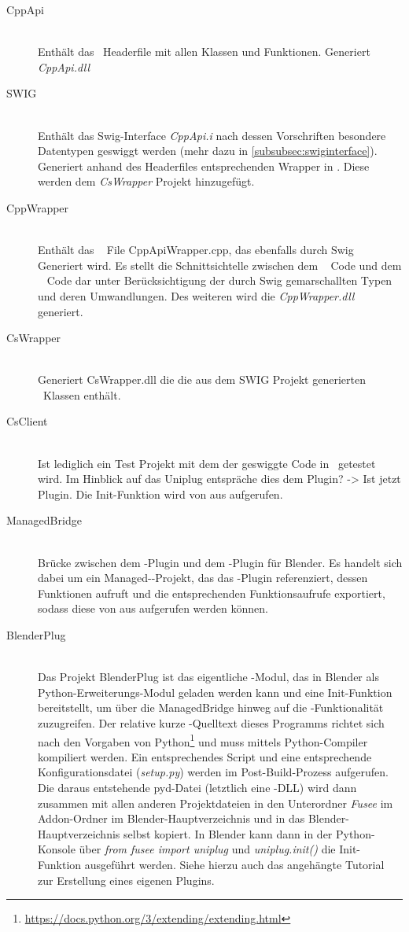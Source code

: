 \begin{description}
\item[CppApi]\hfill \\
Enthält das \CC~Headerfile mit allen Klassen und Funktionen. Generiert \emph{CppApi.dll}
\item[SWIG]\hfill \\
Enthält das Swig-Interface \emph{CppApi.i} nach dessen Vorschriften besondere Datentypen geswiggt werden (mehr dazu in \ref{subsubsec:swiginterface}). Generiert anhand des Headerfiles entsprechenden Wrapper in \CS. Diese werden dem \emph{CsWrapper} Projekt hinzugefügt.
\item[CppWrapper]\hfill \\
Enthält das \CC~ File CppApiWrapper.cpp, das ebenfalls durch Swig Generiert wird. Es stellt die Schnittsichtelle zwischen dem \CC~ Code und dem \CS~ Code dar unter Berücksichtigung der durch Swig gemarschallten Typen und deren Umwandlungen. Des weiteren wird die \emph{CppWrapper.dll} generiert. 
\item[CsWrapper]\hfill \\
Generiert CsWrapper.dll die die aus dem SWIG Projekt generierten \CS~Klassen enthält. 
\item[CsClient]\hfill \\
Ist lediglich ein Test Projekt mit dem der geswiggte Code in \CS~getestet wird. Im Hinblick auf das Uniplug entspräche dies dem Plugin? -> Ist jetzt Plugin. Die Init-Funktion wird von \CS aus aufgerufen.
\item[ManagedBridge]\hfill \\ Brücke zwischen dem \CS-Plugin und dem \CC-Plugin für Blender. Es handelt sich dabei um ein Managed-\CC-Projekt, das das \CS{}-Plugin referenziert, dessen Funktionen aufruft und die entsprechenden Funktionsaufrufe exportiert, sodass diese von \CC aus aufgerufen werden können.
\item[BlenderPlug]\hfill \\ Das Projekt BlenderPlug ist das eigentliche \CC-Modul, das in Blender als Python-Erweiterungs-Modul geladen werden kann und eine Init-Funktion bereitstellt, um über die ManagedBridge hinweg auf die \CS{}-Funktionalität zuzugreifen. Der relative kurze \CC-Quelltext dieses Programms richtet sich nach den Vorgaben von Python\footnote{\url{https://docs.python.org/3/extending/extending.html}} und muss mittels Python-Compiler kompiliert werden. Ein entsprechendes Script und eine entsprechende Konfigurationsdatei (\emph{setup.py}) werden im Post-Build-Prozess aufgerufen. Die daraus entstehende pyd-Datei (letztlich eine \CC-DLL) wird dann zusammen mit allen anderen Projektdateien in den Unterordner \emph{Fusee} im Addon-Ordner im Blender-Hauptverzeichnis und in das Blender-Hauptverzeichnis selbst kopiert. In Blender kann dann in der Python-Konsole über \emph{from fusee import uniplug} und \emph{uniplug.init()} die Init-Funktion ausgeführt werden. Siehe hierzu auch das angehängte Tutorial zur Erstellung eines eigenen Plugins.
\end{description}

